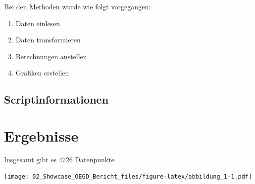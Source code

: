 \documentclass[
]{article}
\providecommand{\tightlist}{%
  \setlength{\itemsep}{0pt}\setlength{\parskip}{0pt}}
\begin{document}
Bei den Methoden wurde wie folgt vorgegangen:

\begin{enumerate}
\def\labelenumi{\arabic{enumi}.}
\tightlist
\item
  Daten einlesen
\item
  Daten transformieren
\item
  Berechnungen anstellen
\item
  Grafiken erstellen
\end{enumerate}

\hypertarget{scriptinformationen}{%
\subsection{Scriptinformationen}\label{scriptinformationen}}

\hypertarget{ergebnisse}{%
\section{Ergebnisse}\label{ergebnisse}}

Insgesamt gibt es 4726 Datenpunkte.

\texttt{[image: 02\_Showcase\_OEGD\_Bericht\_files/figure-latex/abbildung\_1-1.pdf]}
\end{document}
